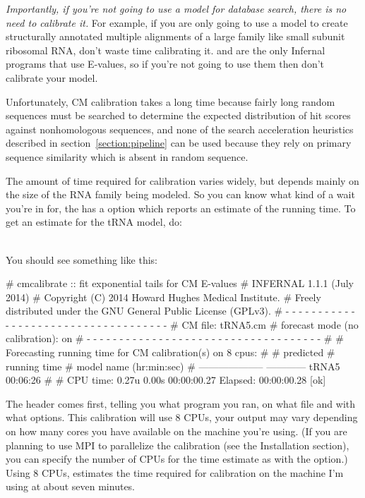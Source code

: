\emph{Importantly, if you're not going to use a model for database
search, there is no need to calibrate it.} For example, if you are
only going to use a model to create structurally annotated multiple
alignments of a large family like small subunit ribosomal RNA, don't
waste time calibrating it.  and  are the
only Infernal programs that use E-values, so if you're not going to
use them then don't calibrate your model.

Unfortunately, CM calibration takes a long time because fairly long
random sequences must be searched to determine the expected
distribution of hit scores against nonhomologous sequences, and none
of the search acceleration heuristics described in
section~\ref{section:pipeline} can be used because they rely on
primary sequence similarity which is absent in random sequence.

The amount of time required for calibration varies widely, but
depends mainly on the size of the RNA family being modeled.
So you can know what kind of a wait you're in for, the
 has a  option which reports an
estimate of the running time. To get an estimate for the tRNA model, do:

\\

You should see something like this:

\begin{sreoutput}
# cmcalibrate :: fit exponential tails for CM E-values
# INFERNAL 1.1.1 (July 2014)
# Copyright (C) 2014 Howard Hughes Medical Institute.
# Freely distributed under the GNU General Public License (GPLv3).
# - - - - - - - - - - - - - - - - - - - - - - - - - - - - - - - - - - - -
# CM file:                                     tRNA5.cm
# forecast mode (no calibration):              on
# - - - - - - - - - - - - - - - - - - - - - - - - - - - - - - - - - - - -
#
# Forecasting running time for CM calibration(s) on 8 cpus:
#
#                          predicted
#                       running time
# model name            (hr:min:sec)
# --------------------  ------------
  tRNA5                     00:06:26
#
# CPU time: 0.27u 0.00s 00:00:00.27 Elapsed: 00:00:00.28
[ok]
\end{sreoutput}

The header comes first, telling you what program you ran, on what file
and with what options. This calibration will use 8 CPUs, your output
may vary depending on how many cores you have available on the machine
you're using. (If you are planning to use MPI to parallelize the
calibration (see the Installation section), you can specify the number
of CPUs for the time estimate as  with the
 option.) Using 8 CPUs, 
estimates the time required for calibration on the machine I'm using
at about seven minutes.

